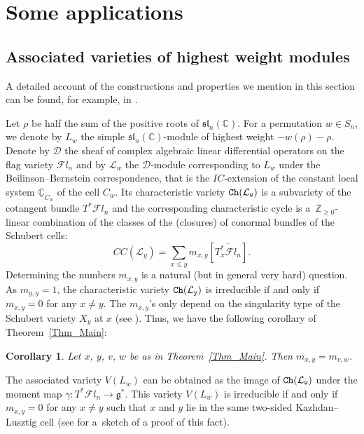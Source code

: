 \documentclass[pdftex]{sigma}
\numberwithin{equation}{section}
\newtheorem{Corollary}[Theorem]{Corollary}
\begin{document}
\section{Some applications} \label{Sec_Applications}

\subsection{Associated varieties of highest weight modules}\label{Sec_BBJ} A detailed account of the constructions and properties we mention in this section can be found, for example, in \cite[Section~1]{tanisaki}.

Let $\rho$ be half the sum of the positive roots of $\mathfrak{sl}_n(\mathbb{C})$. For a permutation $w\in S_n$, we denote by $L_w$ the simple $\mathfrak{sl}_n(\mathbb{C})$-module of highest weight $-w(\rho)-\rho$. Denote by $\mathcal{D}$ the sheaf of complex algebraic linear differential operators on the flag variety $\mathcal{F}l_n$ and by $\mathcal{L}_w$ the $\mathcal{D}$-module corresponding to $L_w$ under the Beilinson--Bernstein correspondence, that is the $IC$-extension of the constant local system $\underline{\mathbb{C}}_{C_w}$ of the cell $C_w$. Its characteristic variety $\tt{Ch}(\mathcal{L}_w)$ is a subvariety of the cotangent bundle $T^*\mathcal{F}l_n$ and the corresponding characteristic cycle is a~$\mathbb{Z}_{\geq 0}$-linear combination of the classes of the (closures) of conormal bundles of the Schubert cells:
\[
CC(\mathcal{L}_y)=\sum_{x\leq y}m_{x,y}[\overline{T^*_x\mathcal{F}l_n}].
\]
Determining the numbers $m_{x,y}$ is a natural (but in general very hard) question. As $m_{y,y}=1$, the characteristic variety $\tt{Ch}(\mathcal{L}_y)$ is irreducible if and only if $m_{x,y}=0$ for any $x\neq y$.
The $m_{x,y}$'s only depend on the singularity type of the Schubert variety $X_y$ at $x$ (see \cite[Section~3.2]{vilonenwilliamson}). Thus, we have the following corollary of Theorem~\ref{Thm_Main}:
\begin{Corollary}\label{Cor:BBJ}
Let $x$, $y$, $v$, $w$ be as in Theorem~{\rm \ref{Thm_Main}}. Then $m_{x,y}=m_{v,w}$.
\end{Corollary}

The associated variety $V(L_w)$ can be obtained as the image of $\tt{Ch}(\mathcal{L}_w)$ under the moment map $\gamma\colon T^*\mathcal{F}l_n\rightarrow \mathfrak{g}^*$. This variety $V(L_w)$ is irreducible if and only if $m_{x,y}=0$ for any $x\neq y$ such that $x$ and $y$ lie in the same two-sided Kazhdan--Lusztig cell (see \cite[Introduction]{williamson} for a~sketch of a proof of this fact).
\end{document}
